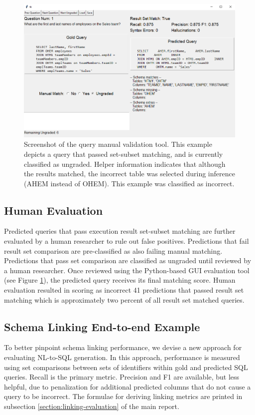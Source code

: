 \begin{figure}
  \centering
  \includegraphics[width=\linewidth]{figures/manual-validation-tool.PNG}
  \caption{Screenshot of the query manual validation tool. This example depicts a query that passed set-subset matching, and is currently classified as ungraded. Helper information indicates that although the results matched, the incorrect table was selected during inference (AHEM instead of OHEM). This example was classified as incorrect.}
  \label{fig:manual-validation-tool}
\end{figure}

\subsection{Human Evaluation}
Predicted queries that pass execution result set-subset matching are further evaluated by a human researcher to rule out false positives.
Predictions that fail result set comparison are pre-classified as also failing manual matching.
Predictions that pass set comparison are classified as ungraded until reviewed by a human researcher.
Once reviewed using the Python-based GUI evaluation tool (see Figure \ref{fig:manual-validation-tool}), the predicted query receives its final matching score.
Human evaluation resulted in scoring as incorrect 41 predictions that passed result set matching which is approximately two percent of all result set matched queries.




\subsection{Schema Linking End-to-end Example}

To better pinpoint schema linking performance, we devise a new approach for evaluating NL-to-SQL generation.
In this approach, performance is measured using set comparisons between sets of identifiers within gold and predicted SQL queries.
Recall is the primary metric.
Precision and F1 are available, but less helpful, due to penalization for additional predicted columns that do not cause a query to be incorrect.
The formulae for deriving linking metrics are printed in subsection \ref{section:linking-evaluation} of the main report.

